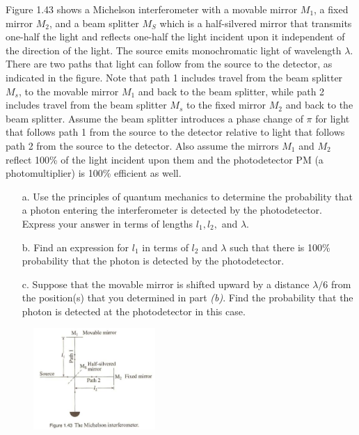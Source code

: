 \documentclass[11pt,letterpaper,boxed,noheader]{pset}
\begin{document}
    \begin{problem} [T1.27]
        Figure 1.43 shows a Michelson interferometer with a movable mirror $M_1$, a fixed mirror $M_2$, and a beam splitter $M_S$ which is a half-silvered mirror that transmits one-half the light and reflects one-half the light incident upon it independent of the direction of the light. The source emits monochromatic light of wavelength $\lambda$. There are two paths that light can follow from the source to the detector, as indicated in the figure. Note that path 1 includes travel from the beam splitter $M_s$, to the movable mirror $M_1$ and back to the beam splitter, while path 2 includes travel from the beam splitter $M_s$ to the fixed mirror $M_2$ and back to the beam splitter. Assume the beam splitter introduces a phase change of $\pi$ for light that follows path 1 from the source to the detector relative to light that follows path 2 from the source to the detector. Also assume the mirrors $M_1$ and $M_2$ reflect 100\% of the light incident upon them and the photodetector PM (a photomultiplier) is 100\% efficient as well.
        
        \begin{enumerate}
            \item [a.] Use the principles of quantum mechanics to determine the probability that a photon entering the interferometer is detected by the photodetector. Express your answer in terms of lengths $l_1, l_2,$ and $\lambda$.
            \item [b.] Find an expression for $l_1$ in terms of $l_2$ and $\lambda$ such that there is 100\% probability that the photon is detected by the photodetector. 
            \item [c.] Suppose that the movable mirror is shifted upward by a distance $\lambda/6$ from the position(s) that you determined in part \textit{(b)}. Find the probability that the photon is detected at the photodetector in this case.
        \end{enumerate}
    \end{problem}
    
    \begin{figure} [ht]
        \includegraphics[width=175px]{HW14Images/T1-27.png}
    \end{figure}
    \newpage
    
\end{document}
